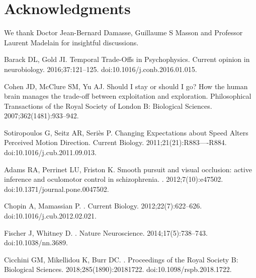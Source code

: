 \documentclass[10pt,letterpaper]{article}
\begin{document}
\section*{Acknowledgments}
We thank Doctor Jean-Bernard Damasse, Guillaume S Masson and Professor Laurent Madelain for insightful discussions.
% 
\begin{thebibliography}{10}

Barack DL, Gold JI.
\newblock Temporal Trade-Offs in Psychophysics.
\newblock Current opinion in neurobiology. 2016;37:121--125.
\newblock doi:{10.1016/j.conb.2016.01.015}.

Cohen JD, McClure SM, Yu AJ.
\newblock Should I stay or should I go? How the human brain manages the
  trade-off between exploitation and exploration.
\newblock Philosophical Transactions of the Royal Society of London B:
  Biological Sciences. 2007;362(1481):933--942.

Sotiropoulos G, Seitz AR, Seri\`es P.
\newblock Changing Expectations about Speed Alters Perceived Motion Direction.
\newblock Current Biology. 2011;21(21):R883----R884.
\newblock doi:{10.1016/j.cub.2011.09.013}.

Adams RA, Perrinet LU, Friston K.
\newblock Smooth pursuit and visual occlusion: active inference and oculomotor
  control in schizophrenia.
. 2012;7(10):e47502.
\newblock doi:{10.1371/journal.pone.0047502}.

Chopin A, Mamassian P.
.
\newblock Current Biology. 2012;22(7):622--626.
\newblock doi:{10.1016/j.cub.2012.02.021}.

Fischer J, Whitney D.
.
\newblock Nature Neuroscience. 2014;17(5):738--743.
\newblock doi:{10.1038/nn.3689}.

Cicchini GM, Mikellidou K, Burr DC.
.
\newblock Proceedings of the Royal Society B: Biological Sciences.
  2018;285(1890):20181722.
\newblock doi:{10.1098/rspb.2018.1722}.


\end{thebibliography}
\end{document}
